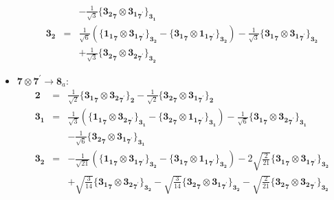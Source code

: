 \documentclass[english]{article}
\newcommand{\subcg}[3]{\big\{ {#1}\otimes{#2}\big\}^{}_{#3}}
\newcommand{\rep}[1]{\mathbf{#1}}
\begin{document}
\begin{itemize}
\begin{eqnarray*}
 & & -\frac{1}{\sqrt{3}}\subcg{\rep{3_2}_{\rep{7}}}{\rep{3_1}_{\rep{7}^{\prime}}}{\rep{3_1}}
\\
\rep{3_2} &=& \frac{1}{\sqrt{6}}\left(\subcg{\rep{1_1}_{\rep{7}}}{\rep{3_1}_{\rep{7}^{\prime}}}{\rep{3_2}}-\subcg{\rep{3_1}_{\rep{7}}}{\rep{1_1}_{\rep{7}^{\prime}}}{\rep{3_2}}\right)-\frac{1}{\sqrt{3}}\subcg{\rep{3_1}_{\rep{7}}}{\rep{3_1}_{\rep{7}^{\prime}}}{\rep{3_2}} \\ 
 & & +\frac{1}{\sqrt{3}}\subcg{\rep{3_2}_{\rep{7}}}{\rep{3_2}_{\rep{7}^{\prime}}}{\rep{3_2}}
\end{eqnarray*}
\item $\rep{7}\otimes\rep{7}^{\prime}\to\rep{8}_{a}$:
\begin{eqnarray*}
\rep{2} &=& \frac{1}{\sqrt{2}}\subcg{\rep{3_1}_{\rep{7}}}{\rep{3_2}_{\rep{7}^{\prime}}}{\rep{2}}-\frac{1}{\sqrt{2}}\subcg{\rep{3_2}_{\rep{7}}}{\rep{3_1}_{\rep{7}^{\prime}}}{\rep{2}}
\\
\rep{3_1} &=& \frac{1}{\sqrt{3}}\left(\subcg{\rep{1_1}_{\rep{7}}}{\rep{3_2}_{\rep{7}^{\prime}}}{\rep{3_1}}-\subcg{\rep{3_2}_{\rep{7}}}{\rep{1_1}_{\rep{7}^{\prime}}}{\rep{3_1}}\right)-\frac{1}{\sqrt{6}}\subcg{\rep{3_1}_{\rep{7}}}{\rep{3_2}_{\rep{7}^{\prime}}}{\rep{3_1}} \\ 
 & & -\frac{1}{\sqrt{6}}\subcg{\rep{3_2}_{\rep{7}}}{\rep{3_1}_{\rep{7}^{\prime}}}{\rep{3_1}}
\\
\rep{3_2} &=& -\frac{1}{\sqrt{21}}\left(\subcg{\rep{1_1}_{\rep{7}}}{\rep{3_1}_{\rep{7}^{\prime}}}{\rep{3_2}}-\subcg{\rep{3_1}_{\rep{7}}}{\rep{1_1}_{\rep{7}^{\prime}}}{\rep{3_2}}\right)-2 \sqrt{\frac{2}{21}}\subcg{\rep{3_1}_{\rep{7}}}{\rep{3_1}_{\rep{7}^{\prime}}}{\rep{3_2}} \\ 
 & & +\sqrt{\frac{3}{14}}\subcg{\rep{3_1}_{\rep{7}}}{\rep{3_2}_{\rep{7}^{\prime}}}{\rep{3_2}}-\sqrt{\frac{3}{14}}\subcg{\rep{3_2}_{\rep{7}}}{\rep{3_1}_{\rep{7}^{\prime}}}{\rep{3_2}}-\sqrt{\frac{2}{21}}\subcg{\rep{3_2}_{\rep{7}}}{\rep{3_2}_{\rep{7}^{\prime}}}{\rep{3_2}}
\end{eqnarray*}
\end{itemize}
\end{document}
